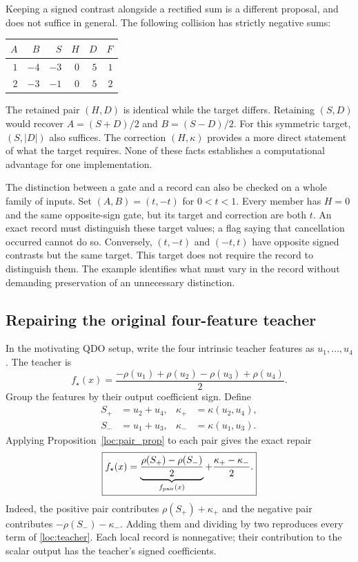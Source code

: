 Keeping a signed contrast alongside a rectified sum is a different proposal,
and does not suffice in general. The following collision has strictly
negative sums:
\begin{center}
\begin{tabular}{rrrrrr}
\toprule
$A$&$B$&$S$&$H$&$D$&$F$\\
\midrule
$1$&$-4$&$-3$&$0$&$5$&$1$\\
$2$&$-3$&$-1$&$0$&$5$&$2$\\
\bottomrule
\end{tabular}
\end{center}
The retained pair $(H,D)$ is identical while the target differs. Retaining
$(S,D)$ would recover $A=(S+D)/2$ and $B=(S-D)/2$. For this symmetric target,
$(S,|D|)$ also suffices. The correction $(H,\kappa)$ provides a more direct
statement of what the target requires. None of these facts establishes a
computational advantage for one implementation.

The distinction between a gate and a record can also be checked on a whole
family of inputs. Set $(A,B)=(t,-t)$ for $0<t<1$. Every member has $H=0$ and
the same opposite-sign gate, but its target and correction are both $t$.
An exact record must distinguish these target values; a flag saying that
cancellation occurred cannot do so. Conversely, $(t,-t)$ and $(-t,t)$ have
opposite signed contrasts but the same target. This target does not require
the record to distinguish them. The example identifies what must vary in
the record without demanding preservation of an unnecessary distinction.

\subsection{Repairing the original four-feature teacher}
\label{loc:teacher_repair}

In the motivating QDO setup, write the four intrinsic teacher features as
$u_1,\ldots,u_4$. The teacher is~\cite{qdo}
\begin{equation}
 f_\star(x)=
 \frac{-\rho(u_1)+\rho(u_2)-\rho(u_3)+\rho(u_4)}{2}.
 \label{loc:teacher}
\end{equation}
Group the features by their output coefficient sign. Define
\begin{align}
 S_+&=u_2+u_4,&\kappa_+&=\kappa(u_2,u_4),\\
 S_-&=u_1+u_3,&\kappa_-&=\kappa(u_1,u_3).
\end{align}
Applying Proposition~\ref{loc:pair_prop} to each pair gives the exact repair
\begin{equation}
 \boxed{
 f_\star(x)=
 \underbrace{\frac{\rho(S_+)-\rho(S_-)}{2}}_{f_{\rm pair}(x)}
 +\frac{\kappa_+-\kappa_-}{2}.}
 \label{loc:teacher_repair_identity}
\end{equation}
Indeed, the positive pair contributes $\rho(S_+)+\kappa_+$ and the negative
pair contributes $-\rho(S_-)-\kappa_-$. Adding them and dividing by two
reproduces every term of \eqref{loc:teacher}. Each local record is
nonnegative; their contribution to the scalar output has the teacher's
signed coefficients.

